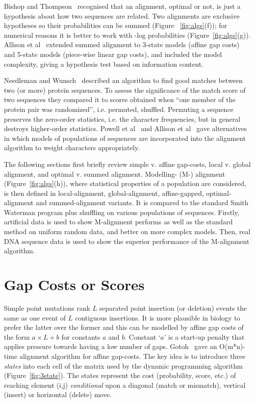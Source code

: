 \documentclass[a4paper,11pt,oneside]{article}
\begin{document}
Bishop and Thompson~\cite{bishop86} recognised that an alignment, optimal or not,
is just a hypothesis about how two sequences are related.
Two alignments are exclusive hypotheses so their probabilities
can be summed (Figure ~\ref{fig:algs}(f));
for numerical reasons it is better to work with -log probabilities (Figure~\ref{fig:algs}(g)).
Allison et al~\cite{allison92a} extended summed alignment to
3-state models (affine gap costs) and
5-state models (piece-wise linear gap costs),
and included the model complexity,
giving a hypothesis test based on information content.

Needleman and Wunsch~\cite{needleman70} described an algorithm to find good matches between
two (or more) protein sequences.
To assess the significance of the match score of two sequences
they compared it to scores obtained
when ``one member of the protein pair was randomized'', i.e. permuted, shuffled.
Permuting a sequence preserves the zero-order statistics,
i.e. the character frequencies, but
in general destroys higher-order statistics.
Powell et al~\cite{powell98b} and Allison et al~\cite{allison99} gave alternatives in which models
of populations of sequences are incorporated into the alignment algorithm
to weight characters appropriately.

The following sections first briefly review
simple v. affine gap-costs,
local v. global alignment, and
optimal v. summed alignment.
Modelling- (M-) alignment (Figure~\ref{fig:algs}(h)), where statistical properties of a
population are considered, is then defined in
local-alignment, global-alignment, affine-gapped, optimal-alignment and summed-alignment variants.
It is compared to the standard Smith Waterman program plus shuffling
on various populations of sequences.
Firstly, artificial data is used to show M-alignment performs as well as the
standard method on uniform random data, and better on more complex models. 
Then, real DNA sequence data is used to show the superior performance of the
M-alignment algorithm.



\section{Gap Costs or Scores}

Simple point mutations rank $L$ separated point insertion (or deletion) events
the same as one event of $L$ contiguous insertions.
It is more plausible in biology to prefer the latter over the former and
this can be modelled by affine gap costs of the form $a \times L+b$ for
constants $a$ and $b$.
Constant `$a$' is a start-up penalty that applies pressure towards having
a low number of gaps.
Gotoh~\cite{gotoh82} gave an O(m*n)-time alignment algorithm for affine gap-costs.
The key idea is to introduce three {\em states} into  each cell of
the matrix used by the dynamic programming algorithm (Figure~\ref{fig:3state}).
The states represent the cost (probability, score, etc.) of reaching
element (i,j) {\em conditional} upon a
diagonal (match or mismatch), vertical (insert) or horizontal (delete) move.
\end{document}

